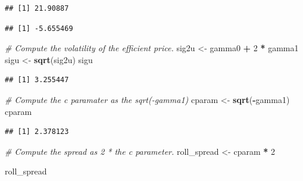 \documentclass[
]{article}
\newenvironment{Shaded}{\begin{snugshade}}{\end{snugshade}}
\newcommand{\CommentTok}[1]{\textcolor[rgb]{0.56,0.35,0.01}{\textit{#1}}}
\newcommand{\DecValTok}[1]{\textcolor[rgb]{0.00,0.00,0.81}{#1}}
\newcommand{\FunctionTok}[1]{\textcolor[rgb]{0.13,0.29,0.53}{\textbf{#1}}}
\newcommand{\NormalTok}[1]{#1}
\newcommand{\OtherTok}[1]{\textcolor[rgb]{0.56,0.35,0.01}{#1}}
\newcommand{\SpecialCharTok}[1]{\textcolor[rgb]{0.81,0.36,0.00}{\textbf{#1}}}
\begin{document}
\begin{verbatim}
## [1] 21.90887
\end{verbatim}

\begin{Shaded}
\end{Shaded}

\begin{verbatim}
## [1] -5.655469
\end{verbatim}

\begin{Shaded}
\begin{Highlighting}[]
\CommentTok{\# Compute the volatility of the efficient price.}
\NormalTok{sig2u }\OtherTok{\textless{}{-}}\NormalTok{ gamma0 }\SpecialCharTok{+} \DecValTok{2} \SpecialCharTok{*}\NormalTok{ gamma1}
\NormalTok{sigu }\OtherTok{\textless{}{-}} \FunctionTok{sqrt}\NormalTok{(sig2u)}
\NormalTok{sigu}
\end{Highlighting}
\end{Shaded}

\begin{verbatim}
## [1] 3.255447
\end{verbatim}

\begin{Shaded}
\begin{Highlighting}[]
\CommentTok{\# Compute the c paramater as the sqrt({-}gamma1)}
\NormalTok{cparam }\OtherTok{\textless{}{-}} \FunctionTok{sqrt}\NormalTok{(}\SpecialCharTok{{-}}\NormalTok{gamma1)}
\NormalTok{cparam}
\end{Highlighting}
\end{Shaded}

\begin{verbatim}
## [1] 2.378123
\end{verbatim}

\begin{Shaded}
\begin{Highlighting}[]
\CommentTok{\# Compute the spread as 2 * the c parameter.}
\NormalTok{roll\_spread }\OtherTok{\textless{}{-}}\NormalTok{ cparam }\SpecialCharTok{*} \DecValTok{2}

\NormalTok{roll\_spread}
\end{Highlighting}
\end{Shaded}
\end{document}
